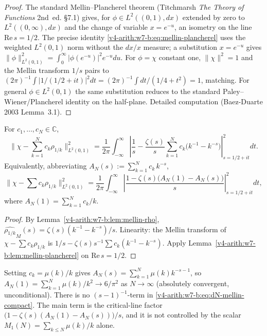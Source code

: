 \begin{proof}
The standard Mellin--Plancherel theorem (Titchmarsh \emph{The Theory
of Functions} 2nd~ed. \S7.1) gives, for
\(\phi\in L^{2}((0,1),dx)\) extended by zero to
\(L^{2}((0,\infty),dx)\) and the change of variable
\(x=e^{-u}\), an isometry on the line
\(\mathrm{Re}\,s=1/2\). The precise identity
\eqref{v4-arith:w7-b:eq:mellin-plancherel} uses the weighted
\(L^{2}(0,1)\) norm without the \(dx/x\) measure; a substitution
\(x=e^{-u}\) gives
\(\|\phi\|_{L^{2}(0,1)}^{2}=\int_{0}^{\infty}|\phi(e^{-u})|^{2}e^{-u}du\).
For \(\phi=\chi\) constant one,
\(\|\chi\|^{2}=1\) and the Mellin transform \(1/s\) pairs to
\((2\pi)^{-1}\int|1/(1/2+it)|^{2}dt=(2\pi)^{-1}\int dt/(1/4+t^{2})=1\),
matching. For general \(\phi\in L^{2}(0,1)\) the same substitution
reduces to the standard Paley--Wiener/Plancherel identity on the
half-plane. Detailed computation (Baez-Duarte 2003 Lemma~3.1).
\end{proof}

\begin{proposition}
\label{v4-arith:w7-b:prop:dN-mellin}
For \(c_{1},\ldots,c_{N}\in\mathbb{C}\),
\begin{equation}
\label{v4-arith:w7-b:eq:dN-mellin}
\|\chi-\sum_{k=1}^{N}c_{k}\rho_{1/k}\|_{L^{2}(0,1)}^{2}
=\frac{1}{2\pi}\int_{-\infty}^{\infty}\!\!\left|\frac{1}{s}-\frac{\zeta(s)}{s}\sum_{k=1}^{N}c_{k}\bigl(k^{-1}-k^{-s}\bigr)\right|^{2}_{s=1/2+it}\!dt.
\end{equation}
Equivalently, abbreviating \(A_{N}(s):=\sum_{k=1}^{N}c_{k}\,k^{-s}\),
\begin{equation}
\label{v4-arith:w7-b:eq:dN-mellin-compact}
\|\chi-\sum c_{k}\rho_{1/k}\|_{L^{2}(0,1)}^{2}
=\frac{1}{2\pi}\int_{-\infty}^{\infty}\!\!\left|\frac{1-\zeta(s)\bigl(A_{N}(1)-A_{N}(s)\bigr)}{s}\right|^{2}_{s=1/2+it}\!dt,
\end{equation}
where \(A_{N}(1)=\sum_{k=1}^{N}c_{k}/k\).
\end{proposition}

\begin{proof}
By Lemma~\ref{v4-arith:w7-b:lem:mellin-rho},
\(\widehat{\rho_{1/k}}_{M}(s)=\zeta(s)(k^{-1}-k^{-s})/s\).
Linearity: the Mellin transform of \(\chi-\sum c_{k}\rho_{1/k}\) is
\(1/s-\zeta(s)s^{-1}\sum c_{k}(k^{-1}-k^{-s})\). Apply
Lemma~\ref{v4-arith:w7-b:lem:mellin-plancherel} on
\(\mathrm{Re}\,s=1/2\).
\end{proof}

\begin{remark}
\label{v4-arith:w7-b:rem:mobius-cancels}
Setting \(c_{k}=\mu(k)/k\) gives
\(A_{N}(s)=\sum_{k=1}^{N}\mu(k)k^{-s-1}\), so
\(A_{N}(1)=\sum_{k=1}^{N}\mu(k)/k^{2}\to 6/\pi^{2}\) as \(N\to\infty\)
(absolutely convergent, unconditional). There is no
\((s-1)^{-1}\)-term in \eqref{v4-arith:w7-b:eq:dN-mellin-compact}. The
main term is the critical-line factor
\(\bigl(1-\zeta(s)(A_N(1)-A_N(s))\bigr)/s\), and it is not controlled by
the scalar \(M_1(N)=\sum_{k\le N}\mu(k)/k\) alone.
\end{remark}

